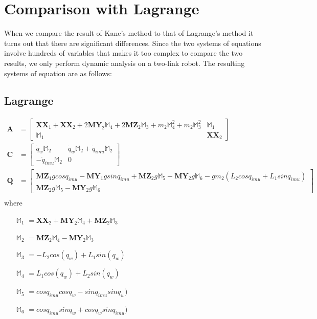 \documentclass[a4paper,10pt]{article}
\begin{document}
\section{Comparison with Lagrange}
When we compare the result of Kane's method to that of Lagrange's method it turns out that there are significant differences.
Since the two systems of equations involve hundreds of variables that makes it too complex to compare the two results, we
only perform dynamic analysis on a two-link robot. The resulting systems of equation are as follows:

\subsection{Lagrange}
\begin{align}
  \mathbf{A} &= \left[ \begin{matrix} 
  \mathbf{XX}_1 + \mathbf{XX}_2 + 2 \mathbf{MY}_2 \mathbb{M}_4 + 2 \mathbf{MZ}_2 \mathbb{M}_3 + m_2 \mathbb{M}_4^2  + m_2 \mathbb{M}_3^2 &  \mathbb{M}_1 \\
  \mathbb{M}_1 &                           \mathbf{XX}_2  
  \end{matrix} \right]  \\
 \mathbf{C} &= \left[ \begin{matrix}
    \dot{q}_w \mathbb{M}_2 &  \dot{q}_w \mathbb{M}_2 + \dot{q}_{imu} \mathbb{M}_2  \\
   -\dot{q}_{imu} \mathbb{M}_2 &          0        
 \end{matrix} \right]   \\
 \mathbf{Q} &= \left[ \begin{matrix}
  \mathbf{MZ}_1 g cosq_{imu} - \mathbf{MY}_1 g sinq_{imu} + \mathbf{MZ}_2 g \mathbb{M}_5 - \mathbf{MY}_2 g \mathbb{M}_6 - g m_2 (L_2 cosq_{imu} + L_1 sinq_{imu})   \\
                                          \mathbf{MZ}_2 g \mathbb{M}_5 - \mathbf{MY}_2 g \mathbb{M}_6                                          
 \end{matrix} \right]   \\ 
\end{align}
where
\begin{itemize}[label={}]
 \item[$\mathbb{M}_1$] $= \mathbf{XX}_2 + \mathbf{MY}_2 \mathbb{M}_4 + \mathbf{MZ}_2 \mathbb{M}_3$
 \item[$\mathbb{M}_2$] $= \mathbf{MZ}_2 \mathbb{M}_4 - \mathbf{MY}_2 \mathbb{M}_3$
 \item[$\mathbb{M}_3$] $= -L_2 cos(q_w) + L_1 sin(q_w)$
 \item[$\mathbb{M}_4$] $= L_1 cos(q_w) + L_2 sin(q_w)$
 \item[$\mathbb{M}_5$] $= cosq_{imu} cosq_w - sinq_{imu} sinq_w)$
 \item[$\mathbb{M}_6$] $= cosq_{imu} sinq_w + cosq_w sinq_{imu})$
\end{itemize}
\end{document}
